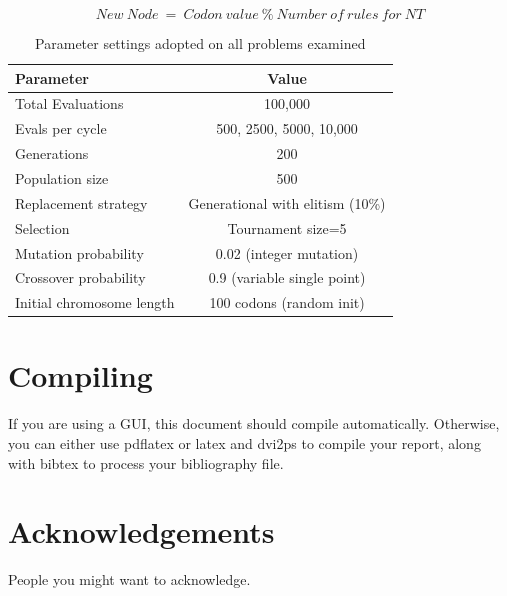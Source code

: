 \documentclass{article}[]
\begin{document}
\begin{equation} New\ Node\ =\ Codon\ value\ \%\ Number\ of\ rules\ for\ NT
\label{eq1}
\end{equation}

\begin{table}
\caption{Parameter settings adopted on all problems examined} %
\centering      %
\begin{tabular}{l|c}  %
\hline                      %
{\bf Parameter}&{\bf Value}\\
\hline                    %
Total Evaluations & 100,000\\
Evals per cycle & 500, 2500, 5000, 10,000\\
Generations & 200\\
Population size & 500\\
Replacement strategy & Generational with elitism (10\%)\\
Selection & Tournament size=5\\
Mutation probability & 0.02 (integer mutation)\\
Crossover probability & 0.9 (variable single point)\\
Initial chromosome length & 100 codons (random init)\\
\hline     %
\end{tabular}
\label{table:params}
 \end{table}

\section{Compiling}

If you are using a GUI, this document should compile automatically. Otherwise,
you can either use pdflatex or latex and dvi2ps to compile your report, along
with bibtex to process your bibliography file.

\section{Acknowledgements}
People you might want to acknowledge.



\end{document}
